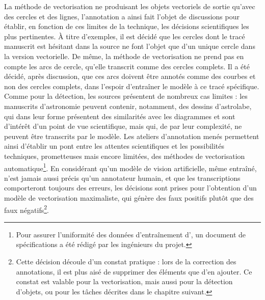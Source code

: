 	La méthode de vectorisation ne produisant les objets vectoriels de sortie qu'avec des cercles et des lignes, l'annotation a ainsi fait l'objet de discussions pour établir, en fonction de ces limites de la technique, les décisions scientifiques les plus pertinentes. À titre d'exemples, il est décidé que les cercles dont le tracé manuscrit est hésitant dans la source ne font l'objet que d'un unique cercle dans la version vectorielle. De même, la méthode de vectorisation ne prend pas en compte les arcs de cercle, qu'elle transcrit comme des cercles complets. Il a été décidé, après discussion, que ces arcs doivent être annotés comme des courbes et non des cercles complets, dans l'espoir d'entraîner le modèle à ce tracé spécifique. Comme pour la détection, les sources présentent de nombreux cas limites : les manuscrits d'astronomie peuvent contenir, notamment, des dessins d'astrolabe, qui dans leur forme présentent des similarités avec les diagrammes et sont d'intérêt d'un point de vue scientifique, mais qui, de par leur complexité, ne peuvent être transcrits par le modèle. Les ateliers d'annotation menés permettent ainsi d'établir un pont entre les attentes scientifiques et les possibilités techniques, prometteuses mais encore limitées, des méthodes de vectorisation automatique\footnote{Pour assurer l'uniformité des données d'entraînement d'\eida, un document de spécifications a été rédigé par les ingénieurs du projet.}. En considérant qu'un modèle de vision artificielle, même entraîné, n'est jamais aussi précis qu'un annotateur humain, et que les transcriptions comporteront toujours des erreurs, les décisions sont prises pour l'obtention d'un modèle de vectorisation maximaliste, qui génère des faux positifs plutôt que des faux négatifs\footnote{Cette décision découle d'un constat pratique : lors de la correction des annotations, il est plus aisé de supprimer des éléments que d'en ajouter. Ce constat est valable pour la vectorisation, mais aussi pour la détection d'objets, ou pour les tâches décrites dans le chapitre suivant.}.

